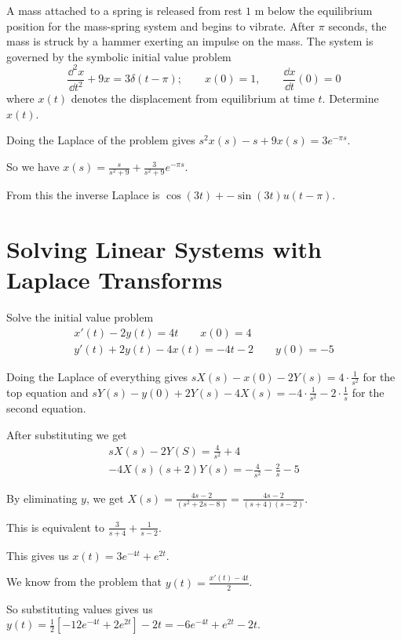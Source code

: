 \documentclass[../diffeq.tex]{subfiles}
\begin{document}
\pagebreak
\begin{example}
    A mass attached to a spring is released from rest $1$ m below the equilibrium position for the mass-spring system and begins to vibrate. After $\pi$ seconds, the mass is struck by a hammer exerting an impulse on the mass.
    The system is governed by the symbolic initial value problem 
    \[ \frac{\dd^2 x}{\dd t^2} + 9x = 3\delta(t-\pi); \qquad x(0)=1, \qquad \frac{\dd x}{\dd t}(0)=0 \]
    where $x(t)$ denotes the displacement from equilibrium at time $t$. Determine $x(t)$.

    Doing the Laplace of the problem gives $s^2x(s)-s+9x(s)=3e^{-\pi s}$.

    So we have $x(s)=\frac{s}{s^2+9}+\frac{3}{s^2+9}e^{-\pi s}$.

    From this the inverse Laplace is $\cos (3t) + -\sin(3t)u(t-\pi)$.
\end{example}

\section{Solving Linear Systems with Laplace Transforms}
\begin{example}
    Solve the initial value problem 
    \begin{align*}
        x'(t)-2y(t)=4t \qquad x(0)=4 \\
        y'(t)+2y(t)-4x(t)=-4t-2 \qquad y(0)=-5
    \end{align*}

    Doing the Laplace of everything gives $sX(s)-x(0)-2Y(s)=4\cdot \frac{1}{s^2}$ for the top equation and $sY(s)-y(0)+2Y(s)-4X(s)=-4\cdot \frac{1}{s^2}-2\cdot \frac{1}{s}$ for the second equation.

    After substituting we get 
    \begin{align*}
        sX(s)-2Y(S)=\frac{4}{s^2}+4 \\
        -4X(s)(s+2)Y(s)=-\frac{4}{s^2}-\frac{2}{s}-5
    \end{align*}

    By eliminating $y$, we get $X(s)=\frac{4s-2}{(s^2+2s-8)}=\frac{4s-2}{(s+4)(s-2)}$.

    This is equivalent to $\frac{3}{s+4}+\frac{1}{s-2}$.

    This gives us $x(t)=3e^{-4t}+e^{2t}$.

    We know from the problem that $y(t)=\frac{x'(t)-4t}{2}$.

    So substituting values gives us $y(t)=\frac{1}{2}[-12e^{-4t}+2e^{2t}]-2t=-6e^{-4t}+e^{2t}-2t$.
\end{example}
\end{document}
